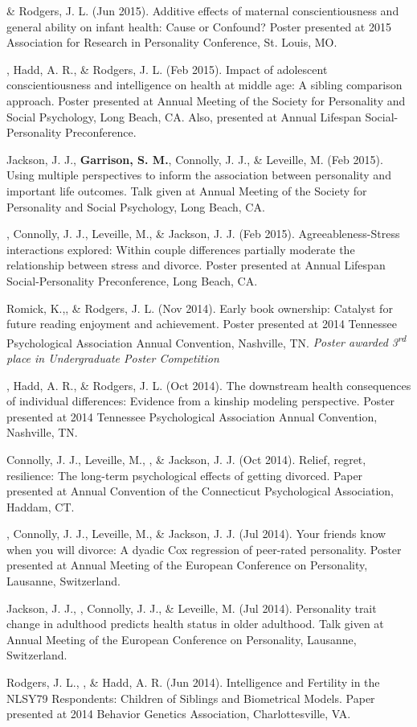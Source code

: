 %
\item \meb \& Rodgers, J. L. (Jun 2015). Additive effects of maternal conscientiousness and general ability on infant health: Cause or Confound? Poster presented at 2015 Association for Research in Personality Conference, St. Louis, MO.%
\item \meb, Hadd, A. R., \& Rodgers, J. L. (Feb 2015). Impact of adolescent conscientiousness and intelligence on health at middle age: A sibling comparison approach. Poster presented at Annual Meeting of the Society for Personality and Social Psychology, Long Beach, CA. Also, presented at Annual Lifespan Social-Personality Preconference.
\item Jackson, J. J., \textbf{Garrison, S. M.}, Connolly, J. J., \& Leveille, M. (Feb 2015). Using multiple perspectives to inform the association between personality and important life outcomes. Talk given at Annual Meeting of the Society for Personality and Social Psychology, Long Beach, CA.
\item\meb, Connolly, J. J., Leveille, M., \& Jackson, J. J. (Feb 2015). Agreeableness-Stress interactions explored: Within couple differences partially moderate the relationship between stress and divorce. Poster presented at Annual Lifespan Social-Personality Preconference, Long Beach, CA.
%
\item Romick, K.,\student \meb, \& Rodgers, J. L. (Nov 2014). Early book ownership: Catalyst for future reading enjoyment and achievement. Poster presented at 2014 Tennessee Psychological Association Annual Convention, Nashville, TN. \textit{Poster awarded 3\textsuperscript{rd} place in Undergraduate Poster Competition}
\item\meb, Hadd, A. R., \& Rodgers, J. L. (Oct 2014). The downstream health consequences of individual differences: Evidence from a kinship modeling perspective. Poster presented at 2014 Tennessee Psychological Association Annual Convention, Nashville, TN.
\item Connolly, J. J., Leveille, M., \meb, \& Jackson, J. J. (Oct 2014). Relief, regret, resilience: The long-term psychological effects of getting divorced. Paper presented at Annual Convention of the Connecticut Psychological Association, Haddam, CT.
\item\meb, Connolly, J. J., Leveille, M., \& Jackson, J. J. (Jul 2014). Your friends know when you will divorce: A dyadic Cox regression of peer-rated personality. Poster presented at Annual Meeting of the European Conference on Personality, Lausanne, Switzerland.
\item Jackson, J. J., \meb, Connolly, J. J., \& Leveille, M. (Jul 2014). Personality trait change in adulthood predicts health status in older adulthood. Talk given at Annual Meeting of the European Conference on Personality, Lausanne, Switzerland.
\item Rodgers, J. L., \meb, \& Hadd, A. R. (Jun 2014). Intelligence and Fertility in the NLSY79 Respondents: Children of Siblings and Biometrical Models. Paper presented at 2014 Behavior Genetics Association, Charlottesville, VA. 

